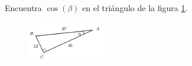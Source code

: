 \question[15] Encuentra $\cos(\beta)$ en el triángulo de la figura \ref{fig:functrig12}.
\begin{figure}[H]
    \begin{center}
        \includegraphics[width=0.3\textwidth]{../images/functrig12.png}
    \end{center}
    \caption{}
    \label{fig:functrig12}
\end{figure}
